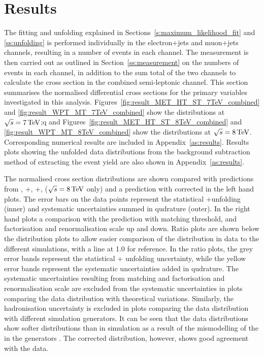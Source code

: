 


\section{Results}
\label{s:results}

The fitting and unfolding explained in Sections~\ref{s:maximum_likelihood_fit} and \ref{ss:unfolding} is
performed individually in the electron+jets and muon+jets channels, resulting in a number of \ttbar events in
each channel. The measurement is then carried out as outlined in Section~\ref{ss:measurement} on the numbers
of events in each channel, in addition to the sum total of the two channels to calculate the cross section in
the combined semi-leptonic channel. This section summarises the normalised differential cross sections for the
primary variables investigated in this analysis. Figures~\ref{fig:result_MET_HT_ST_7TeV_combined} and
\ref{fig:result_WPT_MT_7TeV_combined} show the distributions at $\sqrt{s}=7\,\text{Te\hspace{-.08em}V}$;q and
Figures~\ref{fig:result_MET_HT_ST_8TeV_combined} and \ref{fig:result_WPT_MT_8TeV_combined} show the
distributions at $\sqrt{s}=8\,\text{Te\hspace{-.08em}V}$. Corresponding numerical results are included in Appendix~\ref{as:results}.
Results plots showing the unfolded data distributions from the background subtraction method of extracting the
\ttbar event yield are also shown in Appendix~\ref{as:results}.

The normalised cross section distributions are shown compared with predictions from \MADGRAPH,
\POWHEG+\PYTHIA, \POWHEG+\HERWIG, \MCATNLO ($\sqrt{s}=8\,\text{Te\hspace{-.08em}V}$ only) and a \MADGRAPH prediction with corrected
\tquark \pt in the left hand plots. The error bars on the data points represent the statistical +unfolding
(inner) and systematic uncertainties summed in qudrature (outer). In the right hand plots a comparison with
the \MADGRAPH prediction with matching threshold, and factorisation and renormalisation scale up and down.
Ratio plots are shown below the distribution plots to allow easier comparison of the distribution in data to
the different simulations, with a line at 1.0 for reference. In the ratio plots, the grey error bands
represent the statistical + unfolding uncertainty, while the yellow error bands represent the systematic
uncertainties added in qudrature. The systematic uncertainties resulting from matching and factorisation and
renormalisation scale are excluded from the systematic uncertainties in plots comparing the data distribution
with theoretical variations. Similarly, the hadronisation uncertainty is excluded in plots comparing the data
distribution with different simulation generators. It can be seen that the data distributions show softer
distributions than in simulation as a result of the mismodelling of the \tquark \pt in the generators
\cite{Chatrchyan:2012saa}. The corrected \MADGRAPH distribution, however, shows good agreement with the data.

